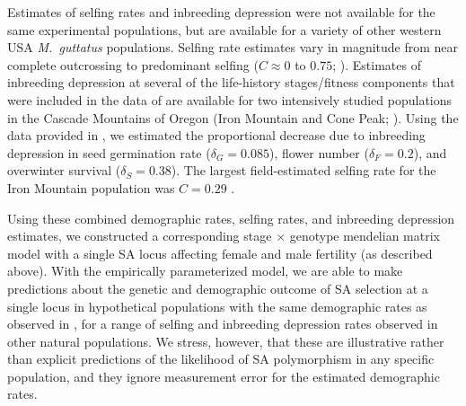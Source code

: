 \documentclass[11pt]{article}
\begin{document}
Estimates of selfing rates and inbreeding depression were not available for the same experimental populations, but are available for a variety of other western USA {\itshape M.~guttatus} populations. Selfing rate estimates vary in magnitude from near complete outcrossing to predominant selfing ($C \approx 0$ to $0.75$; \citealt{RitlandGanders1987, Ritland1990, Willis1999b}). Estimates of inbreeding depression at several of the life-history stages/fitness components that were included in the data of \citet{PetersonEtAl2016} are available for two intensively studied populations in the Cascade Mountains of Oregon (Iron Mountain and Cone Peak; \citealt{Willis1993, Willis1999a, Willis1999b}). Using the data provided in \citet{Willis1993}, we estimated the proportional decrease due to inbreeding depression in seed germination rate ($\delta_{G} = 0.085$), flower number ($\delta_{F} = 0.2$), and overwinter survival ($\delta_{S} = 0.38$). The largest field-estimated selfing rate for the Iron Mountain population was $C = 0.29$ \citep{Willis1993}.

Using these combined demographic rates, selfing rates, and inbreeding depression estimates, we constructed a corresponding stage $\times$ genotype mendelian matrix model with a single SA locus affecting female and male fertility (as described above). With the empirically parameterized model, we are able to make predictions about the genetic and demographic outcome of SA selection at a single locus in hypothetical populations with the same demographic rates as observed in \citet{PetersonEtAl2016}, for a range of selfing and inbreeding depression rates observed in other natural populations. We stress, however, that these are illustrative rather than explicit predictions of the likelihood of SA polymorphism in any specific population, and they ignore measurement error for the estimated demographic rates.
\end{document}
